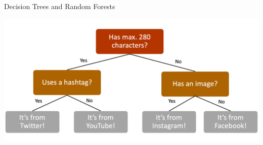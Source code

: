 \documentclass[handout]{beamer}
\begin{document}
\begin{frame}{Decision Trees and Random Forests}
	
	\begin{center}
		\includegraphics[width=\linewidth,height=\textheight,keepaspectratio]{../pictures/decisiontree.png} \\\
	\end{center}
	
	
	
	
	
	
	 
	
\end{frame}
\end{document}

